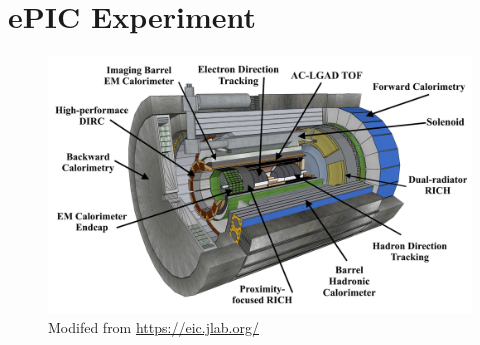 \chapter{ePIC Experiment}\label{cha:epic} %

\begin{figure}[H]
    \centering
    \includegraphics[width=.9\linewidth]{img/ePIC_skp.png}
    \caption{Modifed from \url{https://eic.jlab.org/}}
    \label{fig:epic:epic}
\end{figure}

\section{}